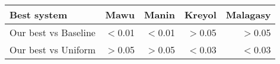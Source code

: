 \begin{tabular}{lrrrr}
\toprule
Best system & Mawu & Manin & Kreyol & Malagasy \\
\toprule
Our best vs Baseline & $<$0.01 & $<$0.01 & $>$0.05 & $>$0.05 \\
Our best vs Uniform & $>$0.05 & $>$0.05 & $<$0.03 & $<$0.03 \\
\bottomrule
\end{tabular}
